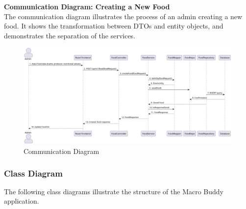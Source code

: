 \documentclass[a4paper,10pt]{article}
\begin{document}
            \newpage
            \textbf{Communication Diagram: Creating a New Food}\\
            The communication diagram illustrates the process of an admin creating a new food. It shows the transformation between DTOs and entity objects, and demonstrates the separation of the services.

            \begin{figure}[h]
            \centering
            \includegraphics[width=1\textwidth]{communication}
            \caption{Communication Diagram}
            \end{figure}

        \subsubsection{Class Diagram}
            The following class diagrams illustrate the structure of the Macro Buddy application.
\end{document}
